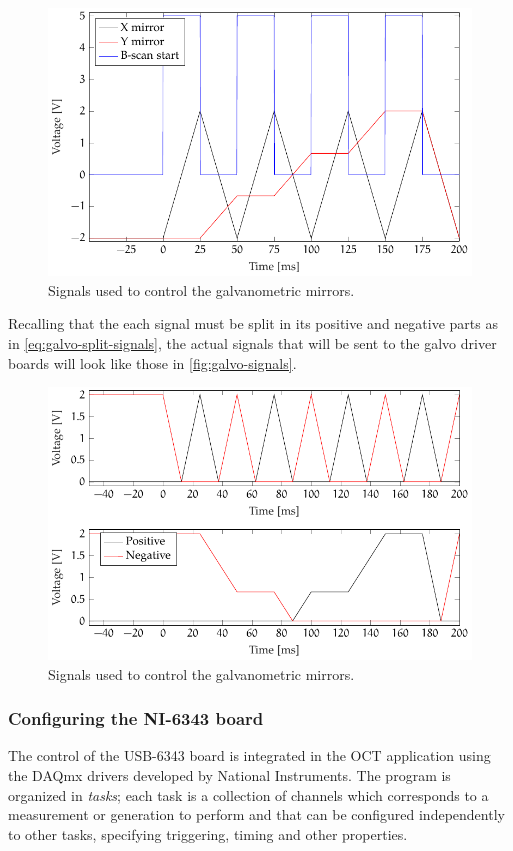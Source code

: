 \begin{figure}[htb]
	\myfloatalign
	\includegraphics[width=0.9\linewidth]{gfx/ch4/galvo-signals}
	\caption{Signals used to control the galvanometric mirrors.}\label{fig:galvo-signals}
\end{figure}

Recalling that the each signal must be split in its positive and negative parts as in \autoref{eq:galvo-split-signals}, the actual signals that will be sent to the galvo driver boards will look like those in \autoref{fig:galvo-signals}.

\begin{figure}[htb]
	\myfloatalign
	\includegraphics[width=0.9\linewidth]{gfx/ch4/galvo-signals-split}
	\caption{Signals used to control the galvanometric mirrors.}\label{fig:galvo-signals-split}
\end{figure}

\subsubsection*{Configuring the NI-6343 board}
The control of the USB-6343 board is integrated in the OCT application using the DAQmx drivers developed by National Instruments. The program is organized in \emph{tasks}; each task is a collection of channels which corresponds to a measurement or generation to perform and that can be configured independently to other tasks, specifying triggering, timing and other properties. 

